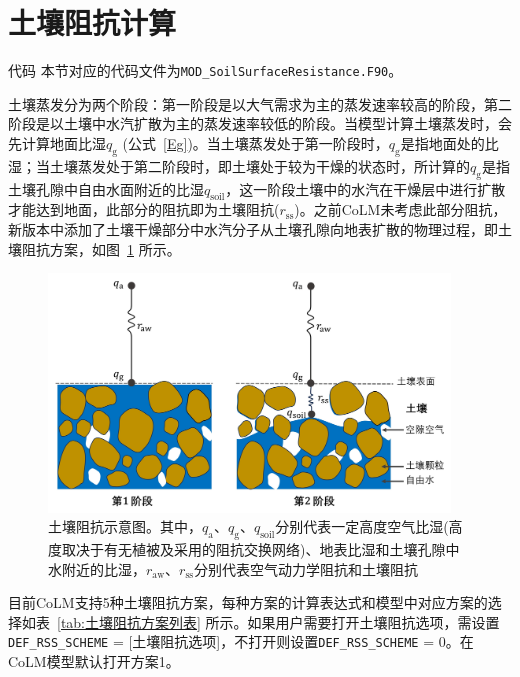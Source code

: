 \section{土壤阻抗计算}
\begin{mymdframed}{代码}
  本节对应的代码文件为\texttt{MOD\_SoilSurfaceResistance.F90}。
\end{mymdframed}

土壤蒸发分为两个阶段：第一阶段是以大气需求为主的蒸发速率较高的阶段，第二阶段是以土壤中水汽扩散为主的蒸发速率较低的阶段。当模型计算土壤蒸发时，会先计算地面比湿\(q_{\mathrm{g}}\) (公式~\eqref{Eg})。当土壤蒸发处于第一阶段时，\(q_{\mathrm{g}}\)是指地面处的比湿；当土壤蒸发处于第二阶段时，即土壤处于较为干燥的状态时，所计算的\(q_{\mathrm{g}}\)是指土壤孔隙中自由水面附近的比湿\(q_{\mathrm{soil}}\)，这一阶段土壤中的水汽在干燥层中进行扩散才能达到地面，此部分的阻抗即为土壤阻抗(\(r_{\mathrm{ss}}\))。之前CoLM未考虑此部分阻抗，新版本中添加了土壤干燥部分中水汽分子从土壤孔隙向地表扩散的物理过程，即土壤阻抗方案，如图~\ref{fig:土壤阻抗示意图} 所示。

{
  \begin{figure}[htbp]
    \centering
    \includegraphics[width=0.95\textwidth]{Figures/地表湍流交换过程/土壤阻抗示意图_v5.jpg}
    \caption[土壤阻抗示意图]{土壤阻抗示意图。其中，\(q_{\mathrm{a}}\)、\(q_{\mathrm{g}}\)、\(q_{\mathrm{soil}}\)分别代表一定高度空气比湿(高度取决于有无植被及采用的阻抗交换网络)、地表比湿和土壤孔隙中水附近的比湿，\(r_{\mathrm{aw}}\)、\(r_{\mathrm{ss}}\)分别代表空气动力学阻抗和土壤阻抗}
    \label{fig:土壤阻抗示意图}
  \end{figure}
}

目前CoLM支持5种土壤阻抗方案，每种方案的计算表达式和模型中对应方案的选择如表~\ref{tab:土壤阻抗方案列表} 所示。如果用户需要打开土壤阻抗选项，需设置\texttt{DEF\_RSS\_SCHEME}
= {[}土壤阻抗选项{]}，不打开则设置\texttt{DEF\_RSS\_SCHEME} =
0。在CoLM模型默认打开方案1。

